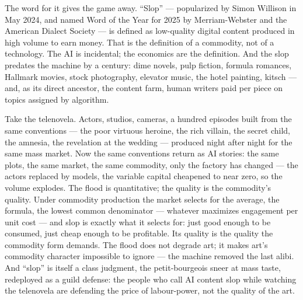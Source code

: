 \documentclass[11pt]{article}
\begin{document}
The word for it gives the game away. ``Slop'' --- popularized by Simon
Willison in May 2024, and named Word of the Year for 2025 by
Merriam-Webster and the American Dialect Society --- is defined as
low-quality digital content produced in high volume to earn money. That
is the definition of a commodity, not of a technology. The AI is
incidental; the economics are the definition. And the slop predates the
machine by a century: dime novels, pulp fiction, formula romances,
Hallmark movies, stock photography, elevator music, the hotel painting,
kitsch --- and, as its direct ancestor, the content farm, human writers
paid per piece on topics assigned by algorithm.

Take the telenovela. Actors, studios, cameras, a hundred episodes built
from the same conventions --- the poor virtuous heroine, the rich
villain, the secret child, the amnesia, the revelation at the wedding
--- produced night after night for the same mass market. Now the same
conventions return as AI stories: the same plots, the same market, the
same commodity, only the factory has changed --- the actors replaced by
models, the variable capital cheapened to near zero, so the volume
explodes. The flood is quantitative; the quality is the commodity's
quality. Under commodity production the market selects for the average,
the formula, the lowest common denominator --- whatever maximizes
engagement per unit cost --- and slop is exactly what it selects for:
just good enough to be consumed, just cheap enough to be profitable.
Its quality is the quality the commodity form demands. The flood does
not degrade art; it makes art's commodity character impossible to
ignore --- the machine removed the last alibi. And ``slop'' is itself a
class judgment, the petit-bourgeois sneer at mass taste, redeployed as
a guild defense: the people who call AI content slop while watching the
telenovela are defending the price of labour-power, not the quality of
the art.
\end{document}
